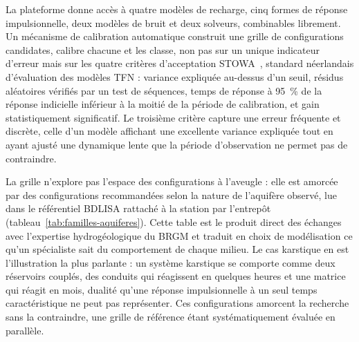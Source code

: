 La plateforme donne accès à quatre modèles de recharge, cinq formes de réponse impulsionnelle, deux modèles de bruit et deux solveurs, combinables librement. Un mécanisme de calibration automatique construit une grille de configurations candidates, calibre chacune et les classe, non pas sur un unique indicateur d'erreur mais sur les quatre critères d'acceptation STOWA~\cite{stowa2021}, standard néerlandais d'évaluation des modèles TFN : variance expliquée au-dessus d'un seuil, résidus aléatoires vérifiés par un test de séquences, temps de réponse à \SI{95}{\percent} de la réponse indicielle inférieur à la moitié de la période de calibration, et gain statistiquement significatif. Le troisième critère capture une erreur fréquente et discrète, celle d'un modèle affichant une excellente variance expliquée tout en ayant ajusté une dynamique lente que la période d'observation ne permet pas de contraindre.

La grille n'explore pas l'espace des configurations à l'aveugle : elle est amorcée par des configurations recommandées selon la nature de l'aquifère observé, lue dans le référentiel BDLISA rattaché à la station par l'entrepôt (tableau~\ref{tab:familles-aquiferes}). Cette table est le produit direct des échanges avec l'expertise hydrogéologique du BRGM et traduit en choix de modélisation ce qu'un spécialiste sait du comportement de chaque milieu. Le cas karstique en est l'illustration la plus parlante : un système karstique se comporte comme deux réservoirs couplés, des conduits qui réagissent en quelques heures et une matrice qui réagit en mois, dualité qu'une réponse impulsionnelle à un seul temps caractéristique ne peut pas représenter. Ces configurations amorcent la recherche sans la contraindre, une grille de référence étant systématiquement évaluée en parallèle.

